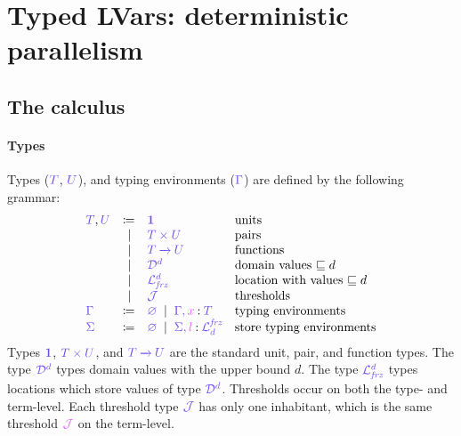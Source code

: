 \documentclass[main.tex]{subfiles}
\begin{document}
\section{Typed LVars: deterministic parallelism}

\subsection{The \typedlambdalvar calculus}



\paragraph*{Types}
Types ($\ty{T}$, $\ty{U}$),  and typing environments ($\ty{\Gamma}$) are defined by the following grammar:
\[
\begin{array}{lrll}
  \ty{T}, \ty{U}
  & \coloneqq & \ty{\tyunit}        & \text{units} \\
  & \sep      & \ty{\typrod{T}{U}}  & \text{pairs} \\
  & \sep      & \ty{\tyfun{T}{U}}   & \text{functions}\\
  & \sep      & \ty{\tyD{d}}        & \text{domain values }{\sqsubseteq d}\\
  & \sep      & \ty{\tyL{\frz}{d}}  & \text{location with values }{\sqsubseteq d}\\
  & \sep      & \ty{\tyJ}           & \text{thresholds}
  \\
  \ty{\Gamma}
  & \coloneqq & \ty{\envemp}
    \sep        \ty{\ty{\Gamma},\tmty{x}{T}}
                                    & \text{typing environments}
  \\
  \ty{\Sigma}
  & \coloneqq & \ty{\envemp}
    \sep        \ty{\ty{\Sigma},\tmty{l}{\tyL{d}{\frz}}}
                                    & \text{store typing environments}
\end{array}
\]
Types $\ty{\tyunit}$, $\ty{\typrod{T}{U}}$, and $\ty{\tyfun{T}{U}}$ are the standard unit, pair, and function types.
The type $\tyD{d}$ types domain values with the upper bound $d$.
The type $\tyL{\frz}{d}$ types locations which store values of type $\tyD{d}$.
Thresholds occur on both the type- and term-level. Each threshold type $\tyJ$ has only one inhabitant, which is the same threshold $\tmJ$ on the term-level.
\end{document}
